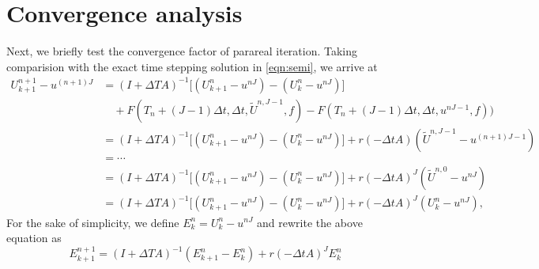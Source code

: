 \section{Convergence analysis}\label{sec:convergence}



Next, we briefly test the convergence factor of parareal iteration.
Taking comparision with the exact time stepping solution in \eqref{eqn:semi}, we arrive at
\begin{equation*}
\begin{aligned}
    U_{k+1}^{n+1} - u^{(n+1)J} &= (I+\Delta TA)^{-1}\Big[(U_{k+1}^{n} - u^{nJ})
- (U_{k}^{n} - u^{nJ})\Big] \\
& \quad + F(T_n+(J-1)\Delta t, \Delta t, \widetilde U^{n,J-1}, f)
- F(T_n+(J-1)\Delta t, \Delta t, u^{nJ-1}, f)) \\
&= (I+\Delta TA)^{-1}\Big[(U_{k+1}^{n} - u^{nJ})
- (U_{k}^{n} - u^{nJ})\Big]
+ r(-\Delta t A) (\widetilde U^{n,J-1}- u^{(n+1)J-1})\\
&=\cdots\\
&= (I+\Delta TA)^{-1}\Big[(U_{k+1}^{n} - u^{nJ})
- (U_{k}^{n} - u^{nJ})\Big]
+ r(-\Delta t A)^J (\widetilde U^{n,0}- u^{nJ})\\
&= (I+\Delta TA)^{-1}\Big[(U_{k+1}^{n} - u^{nJ})
- (U_{k}^{n} - u^{nJ})\Big]
+ r(-\Delta t A)^J ( U_k^{n}- u^{nJ}),
\end{aligned}
\end{equation*}
For the sake of simplicity, we define $E_{k}^{n} = U_k^n - u^{nJ}$ and rewrite the above equation as
$$E_{k+1}^{n+1} = (I+\Delta TA)^{-1} (E_{k+1}^n - E_{k}^{n})
+  r(-\Delta t A)^J E_{k}^{n}
$$

